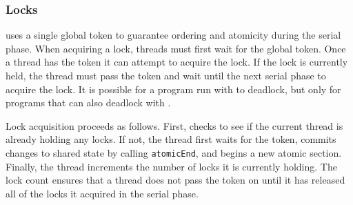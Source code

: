 \subsubsection{Locks}
\label{sec:lock}

\dthreads{} uses a single global token to guarantee ordering and atomicity during the serial phase.  When acquiring a lock, threads must first wait for the global token.  Once a thread has the token it can attempt to acquire the lock.  If the lock is currently held, the thread must pass the token and wait until the next serial phase to acquire the lock.  It is possible for a program run with \dthreads{} to deadlock, but only for programs that can also deadlock with \pthreads{}.




Lock acquisition proceeds as follows. First, \dthreads{} checks 
to see if the current thread is already holding any locks.  If not, the thread first waits for the token, commits changes to shared state by calling \texttt{atomicEnd}, and begins a new atomic section.  Finally, the thread increments the number of locks it is currently holding.  The lock count ensures that a thread does not pass the token on until it has released all of the locks it acquired in the serial phase.

